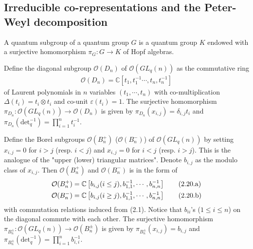 \documentclass[table,a4paper,reqno]{amsart}
\numberwithin{equation}{section}
\theoremstyle{definition}
\begin{document}
\subsection{Irreducible co-representations and the Peter-Weyl decomposition}

A quantum subgroup of a quantum group $G$ is a quantum group $K$ endowed with a surjective homomorphism $\pi_G:G\rightarrow K$ of Hopf algebras.

Define the diagonal subgroup $\mathcal{O}(D_n)$ of $\mathcal{O}(GL_q(n))$ as the commutative ring 
\begin{align}
    \mathcal{O}(D_n)=\mathbb{C}\left[t_1,t_1^{-1}\cdots,t_n,t_n^{-1}\right]\label{eq:2.20}
\end{align}
of Laurent polynomials in $n$ variables $(t_1,\cdots,t_n)$ with co-multiplication $\Delta(t_i)=t_i\otimes t_i$ and co-unit $\varepsilon(t_i)=1$. The surjective homomorphism $\pi_{D_n}:\mathcal{O}(GL_q(n))\rightarrow \mathcal{O}(D_n)$ is given by $\pi_{D_n}(x_{i,j})=\delta_{i,j}t_i$ and $\pi_{D_n}(\text{det}_q^{-1})=\prod_{i=1}^nt_i^{-1}$. 

Define the Borel subgroups $\mathcal{O}(B_n^+)$ ($\mathcal{O}(B_n^-)$) of $\mathcal{O}(GL_q(n))$ by setting $x_{i,j}=0$ for $i>j$ (resp. $i<j$) and $x_{i,j}=0$ for $i<j$ (resp. $i>j$). This is the analogue of the "upper (lower) triangular matrices". Denote $b_{i,j}$ as the modulo class of $x_{i,j}$. Then $\mathcal{O}(B_n^+)$ and $\mathcal{O}(B_n^-)$ is in the form of
\begin{align}\stepcounter{equation}
    \mathcal{O}(B_n^+)&=\mathbb{C}\left[b_{i,j}(i\le j),b_{1,1}^{-1},\cdots ,b_{n,n}^{-1} \right]\tag{2.20.a}\label{eq:2.21.a}\\
    \mathcal{O}(B_n^-)&=\mathbb{C}\left[b_{i,j}(i\ge j),b_{1,1}^{-1},\cdots ,b_{n,n}^{-1} \right]\tag{2.20.b}\label{eq:2.21.b}
\end{align}
with commutation relations induced from (2.1). Notice that $b_{ii}$'s ($1\le i\le n$) on the diagonal commute with each other. The surjective homomorphism $\pi_{B_n^\pm}:\mathcal{O}(GL_q(n))\rightarrow \mathcal{O}(B_n^\pm)$ is given by $\pi_{B_n^\pm}(x_{i,j})=b_{i,j}$ and $\pi_{B_n^\pm}(\text{det}_q^{-1})=\prod_{i=1}^nb_{i,i}^{-1}$.
\end{document}
